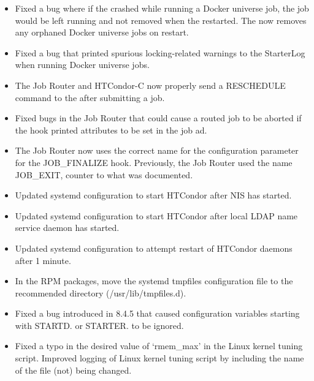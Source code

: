 \begin{itemize}

\item Fixed a bug where if the  crashed while running a
Docker universe job, the job would be left running and not removed when
the  restarted.  The  now removes any
orphaned Docker universe jobs on restart.

\item Fixed a bug that printed spurious locking-related warnings to
the StarterLog when running Docker universe jobs.

\item The Job Router and HTCondor-C now properly send a RESCHEDULE
command to the  after submitting a job.

\item Fixed bugs in the Job Router that could cause a routed job to be
aborted if the  hook printed attributes to be set in
the job ad.

\item The Job Router now uses the correct name for the configuration
parameter for the JOB\_FINALIZE hook.
Previously, the Job Router used the name JOB\_EXIT, counter to what was
documented.

\item Updated systemd configuration to start HTCondor after NIS has started.

\item Updated systemd configuration to start HTCondor after local LDAP name
service daemon has started.

\item Updated systemd configuration to attempt restart of HTCondor daemons
after 1 minute.

\item In the RPM packages, move the systemd tmpfiles configuration file to
the recommended directory (/usr/lib/tmpfiles.d).

\item Fixed a bug introduced in 8.4.5 that caused configuration variables starting with
STARTD. or STARTER. to be ignored.

\item Fixed a typo in the desired value of `rmem\_max' in the Linux kernel
tuning script.  Improved logging of Linux kernel tuning script by including
the name of the file (not) being changed.


\end{itemize}
